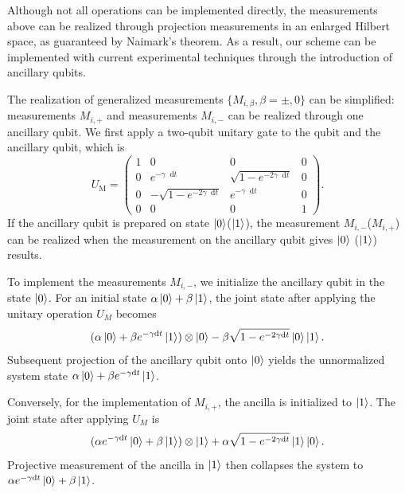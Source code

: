 \documentclass[longbibliography, aps, prx, amsmath, amssymb, amsfonts, twocolumn,superscriptaddress, footinbib]{revtex4-1}
\newcommand{\dif}{\mathop{}\!\mathrm{d}}
\begin{document}
	{Although not all operations can be implemented directly, the measurements above can be realized through projection measurements in an enlarged Hilbert space, as guaranteed by Naimark's theorem. As a result, our scheme can be implemented with current experimental techniques through the introduction of ancillary qubits.}
	
	{The realization of generalized measurements $\{M_{i,\beta}, \beta=\pm,0\}$ can be simplified: measurements $M_{i,+}$ and measurements $M_{i,-}$ can be realized through one ancillary qubit. We first apply a two-qubit unitary gate to the qubit and the ancillary qubit, which is}
	\begin{equation}
		{ U_{\text{M}}} = { \begin{pmatrix}
		  1 & 0 & 0 & 0\\
		  0 & e^{-\gamma \dif t} & \sqrt{1-e^{-2 \gamma \dif t}} & 0\\
		  0 & -\sqrt{1-e^{-2 \gamma \dif t}} & e^{-\gamma \dif t} & 0\\
		  0 & 0 & 0 & 1
		\end{pmatrix}.}
	\end{equation}
	{If the ancillary qubit is prepared on state $\ket{0}$($\ket{1}$), the measurement $M_{i,-}$($M_{i,+}$) can be realized when the measurement on the ancillary qubit gives $\ket{0}$ ($\ket{1}$) results.}

	{To implement the measurements $M_{i,-}$, we initialize the ancillary qubit in the state $\ket{0}$. For an initial state $\alpha \ket{0} + \beta \ket{1}$, the joint state after applying the unitary operation $U_M$ becomes}
	\begin{equation}
		{(\alpha \ket{0} + \beta e^{-\gamma \mathrm{d}t} \ket{1}) \otimes \ket{0} - \beta \sqrt{1-e^{-2\gamma\mathrm{d}t}} \ket{0} \ket{1}.}
	\end{equation}
	{Subsequent projection of the ancillary qubit onto $\ket{0}$ yields the unnormalized system state $\alpha \ket{0} + \beta e^{-\gamma \mathrm{d}t} \ket{1}$.}
	
	{Conversely, for the implementation of $M_{i,+}$, the ancilla is initialized to $\ket{1}$. The joint state after applying $U_M$ is}
	\begin{equation}
		{(\alpha e^{-\gamma \mathrm{d}t} \ket{0} + \beta  \ket{1}) \otimes \ket{1} + \alpha \sqrt{1-e^{-2\gamma\mathrm{d}t}} \ket{1} \ket{0}.}
	\end{equation}
	{Projective measurement of the ancilla in $\ket{1}$ then collapses the system to $\alpha e^{-\gamma \mathrm{d}t} \ket{0} + \beta  \ket{1}$.}
	
\end{document}
